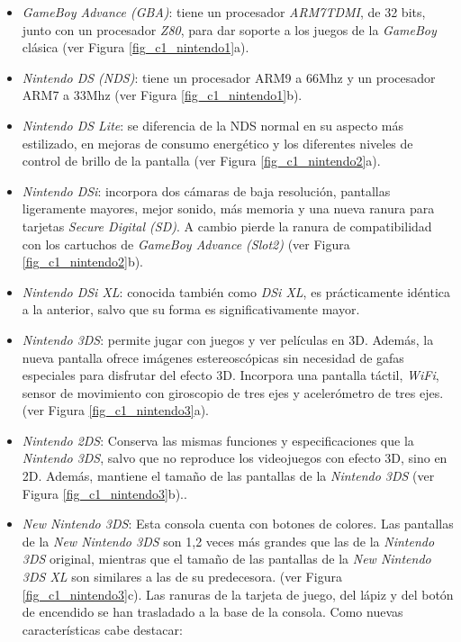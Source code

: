 \begin{itemize}
\item \textit{GameBoy Advance (GBA)}: tiene un procesador \textit{ARM7TDMI}, de 32 	bits, junto con un procesador \textit{Z80}, para dar soporte a los juegos de la \textit{GameBoy} clásica (ver Figura \ref{fig_c1_nintendo1}a). 
%
\item \textit{Nintendo DS (NDS)}: tiene un procesador ARM9 a 66Mhz y un procesador ARM7 a 33Mhz (ver Figura \ref{fig_c1_nintendo1}b).
%	
\item \textit{Nintendo DS Lite}: se diferencia de la NDS normal en su aspecto más estilizado, en mejoras de consumo energético y los diferentes niveles de control de brillo de la pantalla (ver Figura \ref{fig_c1_nintendo2}a). 
%	
\item \textit{Nintendo DSi}: incorpora dos cámaras de baja resolución, pantallas ligeramente mayores, mejor sonido, más memoria y una nueva ranura para tarjetas \textit{Secure Digital (SD)}. A cambio pierde la ranura de compa\-ti\-bilidad con los cartuchos de \textit{GameBoy	Advance (Slot2)} (ver Figura \ref{fig_c1_nintendo2}b).
%
\item \textit{Nintendo DSi XL}: conocida también como \textit{DSi XL}, es prácticamente idéntica a la anterior, salvo que su forma es significativamente mayor. 
%
\item \textit{Nintendo 3DS}: permite jugar con juegos y ver películas en 3D. Además, la nueva pantalla ofrece imágenes estereoscópicas sin necesidad de gafas especiales para disfrutar del efecto 3D. Incorpora una pantalla táctil, \textit{WiFi}, sensor de movimiento con giroscopio de tres ejes y acelerómetro de tres ejes. (ver Figura \ref{fig_c1_nintendo3}a).
%
\item \textit{Nintendo 2DS}: Conserva las mismas funciones y especificaciones que la \textit{Nintendo 3DS}, salvo que no reproduce los videojuegos con efecto 3D, sino en 2D. Además, mantiene el tamaño de las pantallas de la \textit{Nintendo 3DS} (ver Figura \ref{fig_c1_nintendo3}b)..
%	
\item \textit{New Nintendo 3DS}: Esta consola cuenta con botones de colores.  Las pantallas de la \textit{New Nintendo 3DS} son 1,2 veces más grandes que las de la \textit{Nintendo 3DS} original, mientras que el tamaño de las pantallas de la \textit{New Nintendo 3DS XL} son similares a las de su predecesora. (ver Figura \ref{fig_c1_nintendo3}c). Las ranuras de la tarjeta de juego, del lápiz y del botón de encendido se han trasladado a la base de la consola. Como nuevas características cabe destacar:

\end{itemize}
